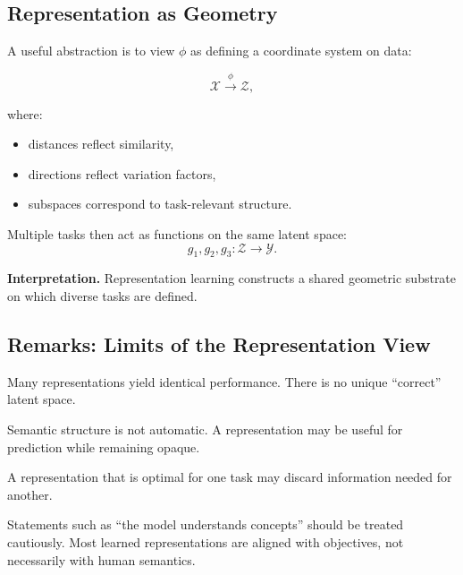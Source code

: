 \subsection{Representation as Geometry}

A useful abstraction is to view $\phi$ as defining a coordinate system on data:

\[
\mathcal{X} \xrightarrow{\;\phi\;} \mathcal{Z},
\]

where:
\begin{itemize}
\item distances reflect similarity,
\item directions reflect variation factors,
\item subspaces correspond to task-relevant structure.
\end{itemize}

Multiple tasks then act as functions on the same latent space:
\[
g_1, g_2, g_3 : \mathcal{Z} \to \mathcal{Y}.
\]

\medskip

\noindent
\textbf{Interpretation.}  
Representation learning constructs a shared geometric substrate on which diverse tasks are defined.

\subsection{Remarks: Limits of the Representation View}

\begin{remark}
Many representations yield identical performance.  
There is no unique ``correct'' latent space.
\end{remark}

\begin{remark}
Semantic structure is not automatic.  
A representation may be useful for prediction while remaining opaque.
\end{remark}

\begin{remark}
A representation that is optimal for one task may discard information needed for another.
\end{remark}

\begin{remark}
Statements such as ``the model understands concepts'' should be treated cautiously.  
Most learned representations are aligned with objectives, not necessarily with human semantics.
\end{remark}

